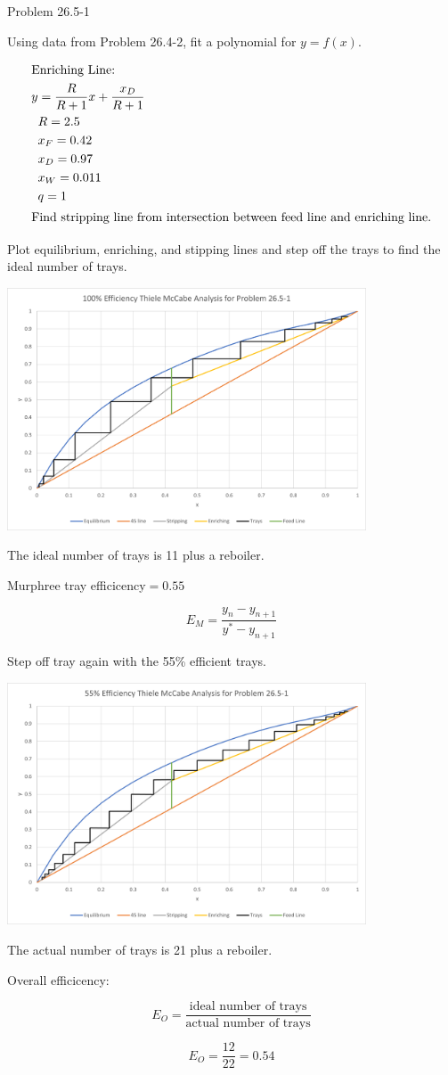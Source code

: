 \item

Problem 26.5-1

Using data from Problem 26.4-2, fit a polynomial for $y=f(x)$.

\begin{align*}
    \intertext{Enriching Line:}
    y &= \frac{R}{R+1} x + \frac{x_D}{R+1} \\
    & R = 2.5 \\
    & x_F = 0.42 \\
    & x_D = 0.97 \\
    & x_W = 0.011 \\
    & q = 1 \\
    \intertext{Find stripping line from intersection between feed line and enriching line.}
\end{align*}

Plot equilibrium, enriching, and stipping lines and step off the trays to find the ideal number of trays.

\begin{center}
    \includegraphics[width=0.8\textwidth]{assets/p1_100.png}
\end{center}

The ideal number of trays is 11 plus a reboiler.

Murphree tray efficicency$=0.55$

\[
    E_M = \frac{y_n - y_{n+1}}{y^* - y_{n+1}}  
\]

Step off tray again with the 55\% efficient trays.

\begin{center}
    \includegraphics[width=0.8\textwidth]{assets/p1_55.png}
\end{center}

The actual number of trays is 21 plus a reboiler.

Overall efficicency:

\[
  E_O = \frac{\text{ideal number of trays}}{\text{actual number of trays}}  
\]

\[
  E_O = \frac{12}{22} = \boxed{0.54}  
\]